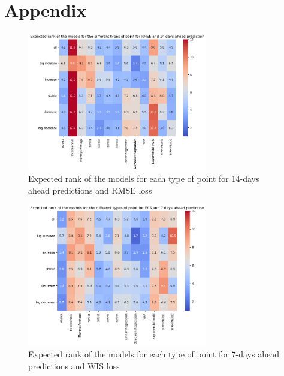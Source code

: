 \section{Appendix}
\label{sec:appendix}



\begin{figure}[h]
    \centering
    \includegraphics[width=0.7\textwidth]{figures/heatmap_RMSE_14.png}
    \caption{Expected rank of the models for each type of point for 14-days ahead predictions and RMSE loss}
    \label{fig:heatmap_RMSE_14}
\end{figure}

\begin{figure}[h]
    \centering
    \includegraphics[width=0.7\textwidth]{figures/heatmap_WIS_7.png}
    \caption{Expected rank of the models for each type of point for 7-days ahead predictions and WIS loss}
    \label{fig:heatmap_WIS_7}
\end{figure}


